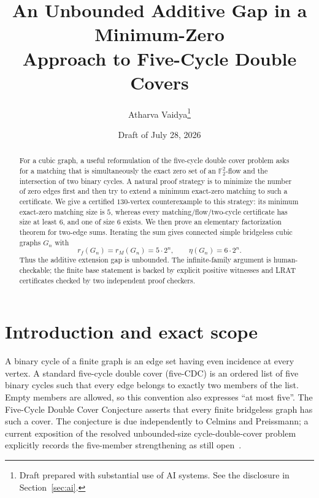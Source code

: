 \documentclass[11pt]{article}
\title{An Unbounded Additive Gap in a Minimum-Zero\\
Approach to Five-Cycle Double Covers}
\author{Atharva Vaidya\thanks{Draft prepared with substantial use of
AI systems.  See the disclosure in Section~\ref{sec:ai}.}}
\date{Draft of July 28, 2026}
\theoremstyle{definition}
\newcommand{\F}{\mathbb F}
\begin{document}
\maketitle

\begin{center}
\end{center}

\begin{abstract}
For a cubic graph, a useful reformulation of the five-cycle double cover
problem asks for a matching that is simultaneously the exact zero set of an
\(\F_2^2\)-flow and the intersection of two binary cycles.  A natural
proof strategy is to minimize the number of zero edges first and then try
to extend a minimum exact-zero matching to such a certificate.  We give a
certified \(130\)-vertex counterexample to this strategy: its minimum
exact-zero matching size is \(5\), whereas every matching/flow/two-cycle
certificate has size at least \(6\), and one of size \(6\) exists.
We then prove an elementary factorization theorem for two-edge sums.
Iterating the sum gives connected simple bridgeless cubic graphs \(G_n\)
with
\[
 r_f(G_n)=r_M(G_n)=5\cdot2^n,\qquad
 \eta(G_n)=6\cdot2^n.
\]
Thus the additive extension gap is unbounded.  The infinite-family
argument is human-checkable; the finite base statement is backed by
explicit positive witnesses and LRAT certificates checked by two
independent proof checkers.
\end{abstract}

\section{Introduction and exact scope}

A binary cycle of a finite graph is an edge set having even incidence at
every vertex.  A standard five-cycle double cover (five-CDC) is an ordered
list of five binary cycles such that every edge belongs to exactly two
members of the list.  Empty members are allowed, so this convention also
expresses ``at most five''.  The Five-Cycle Double Cover Conjecture asserts
that every finite bridgeless graph has such a cover.  The conjecture is
due independently to Celmins and Preissmann; a current exposition of the
resolved unbounded-size cycle-double-cover problem explicitly records the
five-member strengthening as still open~\cite{Oum2026}.
\end{document}
